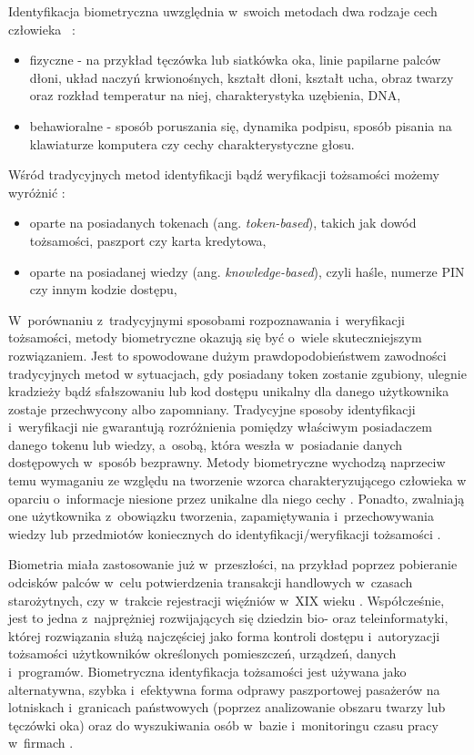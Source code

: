 Identyfikacja biometryczna uwzględnia w~swoich metodach dwa rodzaje cech człowieka ~\cite{Bio01}\cite{Bio02}\cite{Jain00}\cite{Jain08}:
\begin{itemize} 
\item fizyczne - na przykład tęczówka lub siatkówka oka, linie papilarne palców dłoni, układ naczyń krwionośnych, kształt dłoni, kształt ucha, obraz twarzy oraz rozkład temperatur na niej, charakterystyka uzębienia, DNA, 
\item behawioralne - sposób poruszania się, dynamika podpisu, sposób pisania na klawiaturze komputera czy cechy charakterystyczne głosu.
\end{itemize}

Wśród tradycyjnych metod identyfikacji bądź weryfikacji tożsamości możemy wyróżnić \cite{Jain00}\cite{Jain08}:
\begin{itemize}
\item oparte na posiadanych tokenach (ang. \emph{token-based}), takich jak dowód tożsamości, paszport czy karta kredytowa,
\item oparte na posiadanej wiedzy (ang. \emph{knowledge-based}), czyli haśle, numerze PIN czy innym kodzie dostępu,
\end{itemize}
W~porównaniu z~tradycyjnymi sposobami rozpoznawania i~weryfikacji tożsamości, metody biometryczne okazują się być o~wiele skuteczniejszym rozwiązaniem. Jest to spowodowane dużym prawdopodobieństwem zawodności tradycyjnych metod w sytuacjach, gdy posiadany token zostanie zgubiony, ulegnie kradzieży bądź sfałszowaniu lub kod dostępu unikalny dla danego użytkownika zostaje przechwycony albo zapomniany. Tradycyjne sposoby identyfikacji i~weryfikacji nie gwarantują rozróżnienia pomiędzy właściwym posiadaczem danego tokenu lub wiedzy, a~osobą, która weszła w~posiadanie danych dostępowych w~sposób bezprawny. Metody biometryczne wychodzą naprzeciw temu wymaganiu ze względu na tworzenie wzorca charakteryzującego człowieka w oparciu o~informacje niesione przez unikalne dla niego cechy \cite{Jain00}. Ponadto, zwalniają one użytkownika z~obowiązku tworzenia, zapamiętywania i~przechowywania wiedzy lub przedmiotów koniecznych do identyfikacji/weryfikacji tożsamości \cite{Jain08}.  

Biometria miała zastosowanie już w~przeszłości, na przykład poprzez pobieranie odcisków palców w~celu potwierdzenia transakcji handlowych w~czasach starożytnych, czy w~trakcie rejestracji więźniów w~XIX wieku \cite{Bio02}\cite{HF1}. Współcześnie, jest to jedna z~najprężniej rozwijających się dziedzin bio- oraz teleinformatyki, której rozwiązania służą najczęściej jako forma kontroli dostępu i~autoryzacji tożsamości użytkowników określonych pomieszczeń, urządzeń, danych i~programów. Biometryczna identyfikacja tożsamości jest używana jako alternatywna, szybka i~efektywna forma odprawy paszportowej pasażerów na lotniskach i~granicach państwowych (poprzez analizowanie obszaru twarzy lub tęczówki oka) oraz do wyszukiwania osób w~bazie i~monitoringu czasu pracy w~firmach \cite{Bio01}\cite{Bio02}.

